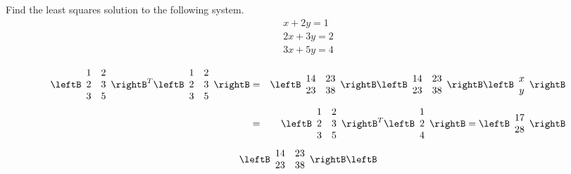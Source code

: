 \begin{enumialphparenastyle}

\begin{ex}
Find the least squares solution to the following system. 
\begin{equation*}
\begin{array}{c}
x+2y=1 \\ 
2x+3y=2 \\ 
3x+5y=4
\end{array}
\end{equation*}
\begin{sol}
\begin{eqnarray*}
\leftB
\begin{array}{cc}
1 & 2 \\
2 & 3 \\
3 & 5
\end{array}
\rightB^{T}\leftB
\begin{array}{cc}
1 & 2 \\
2 & 3 \\
3 & 5
\end{array}
\rightB &=& \leftB
\begin{array}{cc}
14 & 23 \\
23 & 38
\end{array}
\rightB \leftB
\begin{array}{cc}
14 & 23 \\
23 & 38
\end{array}
\rightB \leftB
\begin{array}{c}
x \\
y
\end{array}
\rightB  \\
&=&\leftB
\begin{array}{cc}
1 & 2 \\
2 & 3 \\
3 & 5
\end{array}
\rightB ^{T}\leftB
\begin{array}{c}
1 \\
2 \\
4
\end{array}
\rightB =\leftB
\begin{array}{c}
17 \\
28
\end{array}
\rightB
\end{eqnarray*}
\[
\leftB
\begin{array}{cc}
14 & 23 \\
23 & 38
\end{array}
\rightB \leftB
\begin{array}{c}

\end{array}\]
\end{sol}
\end{ex}
\end{enumialphparenastyle}
